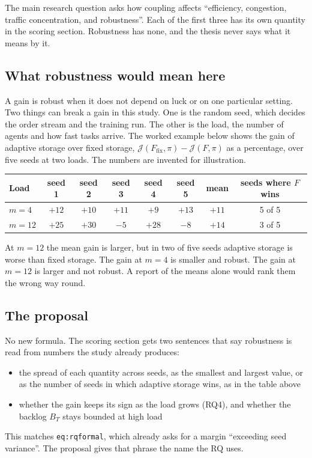 \documentclass[11pt,a4paper]{article}
\begin{document}
The main research question asks how coupling affects ``efficiency,
congestion, traffic concentration, and robustness''. Each of the first
three has its own quantity in the scoring section. Robustness has none,
and the thesis never says what it means by it.

\subsection{What robustness would mean here}

A gain is robust when it does not depend on luck or on one particular
setting. Two things can break a gain in this study. One is the random
seed, which decides the order stream and the training run. The other is
the load, the number of agents and how fast tasks arrive. The worked
example below shows the gain of adaptive storage over fixed storage,
$\mathcal{J}(F_{\mathrm{fix}},\pi) - \mathcal{J}(F,\pi)$ as a percentage,
over five seeds at two loads. The numbers are invented for illustration.

\begin{center}
\begin{tabular}{lccccccc}
  \toprule
  Load & seed 1 & seed 2 & seed 3 & seed 4 & seed 5 & mean & seeds where $F$ wins \\
  \midrule
  $m = 4$  & $+12$ & $+10$ & $+11$ & $+9$ & $+13$ & $+11$ & 5 of 5 \\
  $m = 12$ & $+25$ & $+30$ & $-5$ & $+28$ & $-8$ & $+14$ & 3 of 5 \\
  \bottomrule
\end{tabular}
\end{center}

\noindent At $m = 12$ the mean gain is larger, but in two of five seeds
adaptive storage is worse than fixed storage. The gain at $m = 4$ is
smaller and robust. The gain at $m = 12$ is larger and not robust. A
report of the means alone would rank them the wrong way round.

\subsection{The proposal}

No new formula. The scoring section gets two sentences that say
robustness is read from numbers the study already produces:
\begin{itemize}[nosep]
  \item the spread of each quantity across seeds, as the smallest and
    largest value, or as the number of seeds in which adaptive storage
    wins, as in the table above
  \item whether the gain keeps its sign as the load grows (RQ4), and
    whether the backlog $B_T$ stays bounded at high load
\end{itemize}
This matches \texttt{eq:rqformal}, which already asks for a margin
``exceeding seed variance''. The proposal gives that phrase the name the
RQ uses.
\end{document}
